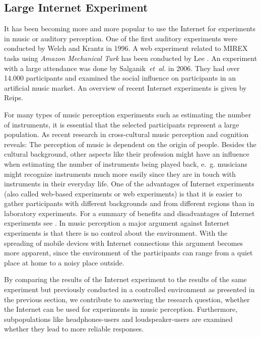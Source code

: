 \subsection{Large Internet Experiment}
It has been becoming more and more popular to use the Internet for experiments in music or auditory perception. One of the first auditory experiments were conducted by Welch and Krantz\cite{Welch1996} in 1996. A web experiment related to MIREX tasks using \emph{Amazon Mechanical Turk} has been conducted by Lee \cite{lee2010}. An experiment with a large attendance was done by Salganik~\textit{et~al.}\cite{Salganik2006} in 2006. They had over 14.000 participants and examined the social influence on participants in an artificial music market. An overview of recent Internet experiments is given by Reips\cite{Reips2012}.
\par
For many types of music perception experiments such as estimating the number of instruments, it is essential that the selected participants represent a large population. As recent research in cross-cultural music perception and cognition reveals: The perception of music is dependent on the origin of people\cite{stevens2012}. Besides the cultural background, other aspects like their profession might have an influence when estimating the number of instruments being played back, e.~g. musicians might recognize instruments much more easily since they are in touch with instruments in their everyday life. One of the advantages of Internet experiments (also called web-based experiments or web experiments) is that it is easier to gather participants with different backgrounds and from different regions than in laboratory experiments. For a summary of benefits and disadvantages of Internet experiments see \cite{Reips2002}. In music perception a major argument against Internet experiments is that there is no control about the environment. With the spreading of mobile devices with Internet connections this argument becomes more apparent, since the environment of the participants can range from a quiet place at home to a noisy place outside.
\par
By comparing the results of the Internet experiment to the results of the same experiment but previously conducted in a controlled environment as presented in the previous section, we contribute to answering the research question, whether the Internet can be used for experiments in music perception.
Furthermore, subpopulations like headphones-users and loudspeaker-users are examined whether they lead to more reliable responses.
\par
